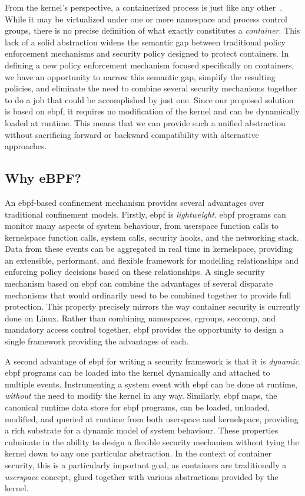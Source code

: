 From the kernel's perspective, a containerized process is just like any
other~\cite{sultan2019_container_security}. While it may be virtualized under one or more
namespace and process control groups, there is no precise definition of what exactly
constitutes a \textit{container}. This lack of a solid abstraction widens the semantic gap
between traditional policy enforcement mechanisms and security policy designed to protect
containers. In defining a new policy enforcement mechanism focused specifically on
containers, we have an opportunity to narrow this semantic gap, simplify the resulting
policies, and eliminate the need to combine several security mechanisms together to do
a job that could be accomplished by just one. Since our proposed solution is based on
\gls{ebpf}, it requires no modification of the kernel and can be dynamically loaded at
runtime.  This means that we can provide such a unified abstraction without sacrificing
forward or backward compatibility with alternative approaches.

\subsection{Why eBPF?}%
\label{ss:why-ebpf}

An \gls{ebpf}-based confinement mechanism provides several advantages over traditional
confinement models.  Firstly, \gls{ebpf} is \textit{lightweight}. \gls{ebpf} programs can monitor
many aspects of system behaviour, from userspace function calls to kernelspace function
calls, system calls, security hooks, and the networking stack. Data from these events can
be aggregated in real time in kernelspace, providing an extensible, performant, and
flexible framework for modelling relationships and enforcing policy decisions based on
these relationships.  A single security mechanism based on \gls{ebpf} can combine the advantages
of several disparate mechanisms that would ordinarily need to be combined together to
provide full protection. This property precisely mirrors the way container security is
currently done on Linux. Rather than combining namespaces, cgroups, seccomp, and mandatory
access control together, \gls{ebpf} provides the opportunity to design a single framework
providing the advantages of each.

A second advantage of \gls{ebpf} for writing a security framework is that it is
\textit{dynamic}. \gls{ebpf} programs can be loaded into the kernel dynamically and attached to
multiple events. Instrumenting a system event with \gls{ebpf} can be done at runtime,
\textit{without} the need to modify the kernel in any way.  Similarly, \gls{ebpf} maps, the
canonical runtime data store for \gls{ebpf} programs, can be loaded, unloaded, modified, and
queried at runtime from both userspace and kernelspace, providing a rich substrate for
a dynamic model of system behaviour. These properties culminate in the ability to design
a flexible security mechanism without tying the kernel down to any one particular
abstraction. In the context of container security, this is a particularly important goal,
as containers are traditionally a \textit{userspace} concept, glued together with various
abstractions provided by the kernel.

